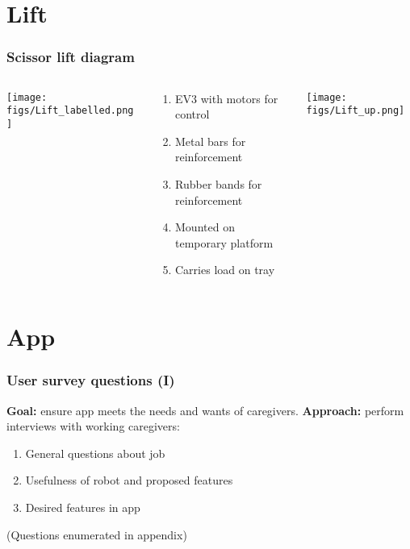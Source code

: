 \documentclass{beamer}
\begin{document}
\section{Lift}
\begin{frame}
  \frametitle{Scissor lift diagram}
  \begin{columns}
    \begin{column}{0.3\textwidth}
      \begin{center}
        \texttt{[image: figs/Lift\_labelled.png]}
      \end{center}
    \end{column}
    \begin{column}{0.3\textwidth}
      \begin{center}
      \begin{enumerate}
        \item EV3 with motors for control
        \item Metal bars for reinforcement
        \item Rubber bands for reinforcement
        \item Mounted on temporary platform
        \item Carries load on tray
        \end{enumerate}
      \end{center}
    \end{column}
    \begin{column}{0.3\textwidth}
      \begin{center}
        \texttt{[image: figs/Lift\_up.png]}
      \end{center}
    \end{column}
  \end{columns}
\end{frame}

\section{App}
\begin{frame}
  \frametitle{User survey questions (I)}
  {\bf Goal: } ensure app meets the needs and wants of caregivers.
  {\bf Approach: } perform interviews with working caregivers: 
  \begin{enumerate}
    \item General questions about job
    \item Usefulness of robot and proposed features
    \item Desired features in app
  \end{enumerate}
  (Questions enumerated in appendix)
\end{frame}
\end{document}
